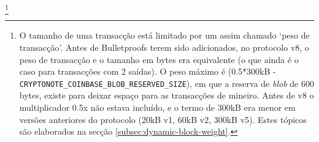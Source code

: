 \footnote{O tamanho de uma transacção está limitado por um assim chamado `peso de transacção'. Antes de Bulletproofs terem sido adicionados, no protocolo v8, o peso de transacção e o tamanho em bytes era equivalente (o que ainda é o caso para transacções com 2 saídas). O peso máximo é (0.5*300kB - {\tt CRYPTONOTE\_COINBASE\_BLOB\_RESERVED\_SIZE}), em que a reserva de {\em blob} de 600 bytes, existe para deixar espaço para as transacções de mineiro. Antes de v8 o multiplicador 0.5x não estava incluído, e o termo de 300kB era menor em versões anteriores do protocolo (20kB v1, 60kB v2, 300kB v5). Estes tópicos são elaborados na secção \ref{subsec:dynamic-block-weight}.}     

